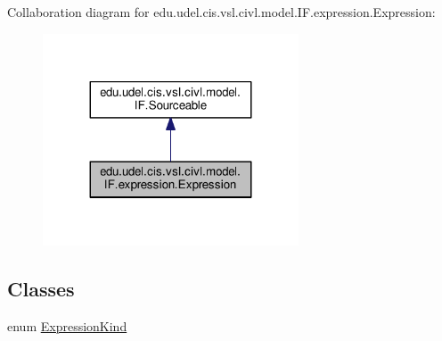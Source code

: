 Collaboration diagram for edu.\+udel.\+cis.\+vsl.\+civl.\+model.\+I\+F.\+expression.\+Expression\+:
\nopagebreak
\begin{figure}[H]
\begin{center}
\leavevmode
\includegraphics[width=215pt]{interfaceedu_1_1udel_1_1cis_1_1vsl_1_1civl_1_1model_1_1IF_1_1expression_1_1Expression__coll__graph}
\end{center}
\end{figure}
\subsection*{Classes}
\begin{DoxyCompactItemize}
\item 
enum \hyperlink{enumedu_1_1udel_1_1cis_1_1vsl_1_1civl_1_1model_1_1IF_1_1expression_1_1Expression_1_1ExpressionKind}{Expression\+Kind}
\end{DoxyCompactItemize}

